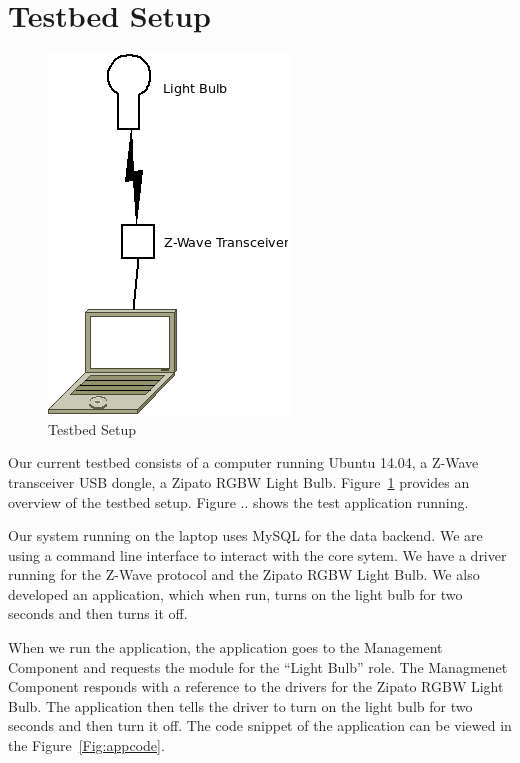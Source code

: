 \section{Testbed Setup}
\label{sec:test}
\begin{figure}[tbh]                                                              
    \centering                                                                   
    \includegraphics[width=0.75\columnwidth]{figs/testbedexp.png}                 
    \caption{Testbed Setup}                                                       
    \label{Fig:testsetup}                                                             
\end{figure} 
Our current testbed consists of a computer running Ubuntu 14.04, a Z-Wave
transceiver USB dongle, a Zipato RGBW Light Bulb. Figure~\ref{Fig:testsetup}
provides an overview of the testbed setup. Figure .. shows the test application
running.

Our system running on the laptop uses MySQL for the data backend. We are using
a command line interface to interact with the core sytem. We have a driver
running for the Z-Wave protocol and the Zipato RGBW Light Bulb. We also
developed an application, which when run, turns on the light bulb for two
seconds and then turns it off. 

When we run the application, the application goes to the Management Component
and requests the module for the ``Light Bulb'' role. The Managmenet Component
responds with a reference to the drivers for the Zipato RGBW Light Bulb. The
application then tells the driver to turn on the light bulb for two seconds and
then turn it off. The code snippet of the application can be viewed in the
Figure~\ref{Fig:appcode}.

